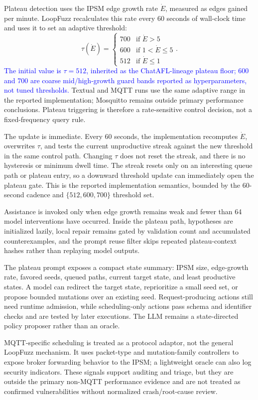 \documentclass[final,5p,times,number]{elsarticle}
\begin{document}
Plateau detection uses the IPSM edge growth rate $\dot{E}$, measured as edges gained per minute. LoopFuzz recalculates this rate every 60 seconds of wall-clock time and uses it to set an adaptive threshold:
\[
\tau(\dot{E}) = \begin{cases}
700 & \text{if } \dot{E} > 5 \\
600 & \text{if } 1 < \dot{E} \le 5 \\
512 & \text{if } \dot{E} \le 1
\end{cases}.
\]
\textcolor{blue}{The initial value is $\tau{=}512$, inherited as the ChatAFL-lineage plateau floor; 600 and 700 are coarse mid/high-growth guard bands reported as hyperparameters, not tuned thresholds.} Textual and MQTT runs use the same adaptive range in the reported implementation; Mosquitto remains outside primary performance conclusions. Plateau triggering is therefore a rate-sensitive control decision, not a fixed-frequency query rule.

The update is immediate. Every 60 seconds, the implementation recomputes $\dot{E}$, overwrites $\tau$, and tests the current unproductive streak against the new threshold in the same control path. Changing $\tau$ does not reset the streak, and there is no hysteresis or minimum dwell time. The streak resets only on an interesting queue path or plateau entry, so a downward threshold update can immediately open the plateau gate. This is the reported implementation semantics, bounded by the 60-second cadence and $\{512,600,700\}$ threshold set.

Assistance is invoked only when edge growth remains weak and fewer than 64 model interventions have occurred. Inside the plateau path, hypotheses are initialized lazily, local repair remains gated by validation count and accumulated counterexamples, and the prompt reuse filter skips repeated plateau-context hashes rather than replaying model outputs.

The plateau prompt exposes a compact state summary: IPSM size, edge-growth rate, favored seeds, queued paths, current target state, and least productive states. A model can redirect the target state, reprioritize a small seed set, or propose bounded mutations over an existing seed. Request-producing actions still need runtime admission, while scheduling-only actions pass schema and identifier checks and are tested by later executions. The LLM remains a state-directed policy proposer rather than an oracle.

MQTT-specific scheduling is treated as a protocol adaptor, not the general LoopFuzz mechanism. It uses packet-type and mutation-family controllers to expose broker forwarding behavior to the IPSM; a lightweight oracle can also log security indicators. These signals support auditing and triage, but they are outside the primary non-MQTT performance evidence and are not treated as confirmed vulnerabilities without normalized crash/root-cause review.
\end{document}
